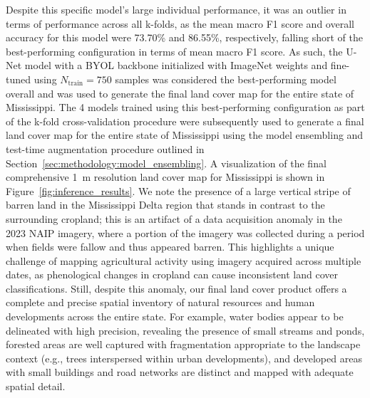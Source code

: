Despite this specific model's large individual performance, it was an outlier in terms of performance across all k-folds, as the mean macro F1 score and overall accuracy for this model were \num{73.70}\% and \num{86.55}\%, respectively, falling short of the best-performing configuration in terms of mean macro F1 score.
As such, the U-Net model with a BYOL backbone initialized with ImageNet weights and fine-tuned using \(N_\text{train} = 750\) samples was considered the best-performing model overall and was used to generate the final land cover map for the entire state of Mississippi.
The 4 models trained using this best-performing configuration as part of the k-fold cross-validation procedure were subsequently used to generate a final land cover map for the entire state of Mississippi using the model ensembling and test-time augmentation procedure outlined in Section~\ref{sec:methodology:model_ensembling}.
A visualization of the final comprehensive \SI{1}{\meter} resolution land cover map for Mississippi is shown in Figure~\ref{fig:inference_results}.
We note the presence of a large vertical stripe of barren land in the Mississippi Delta region that stands in contrast to the surrounding cropland; this is an artifact of a data acquisition anomaly in the 2023 NAIP imagery, where a portion of the imagery was collected during a period when fields were fallow and thus appeared barren.
This highlights a unique challenge of mapping agricultural activity using imagery acquired across multiple dates, as phenological changes in cropland can cause inconsistent land cover classifications.
Still, despite this anomaly, our final land cover product offers a complete and precise spatial inventory of natural resources and human developments across the entire state.
For example, water bodies appear to be delineated with high precision, revealing the presence of small streams and ponds, forested areas are well captured with fragmentation appropriate to the landscape context (e.g., trees interspersed within urban developments), and developed areas with small buildings and road networks are distinct and mapped with adequate spatial detail.



